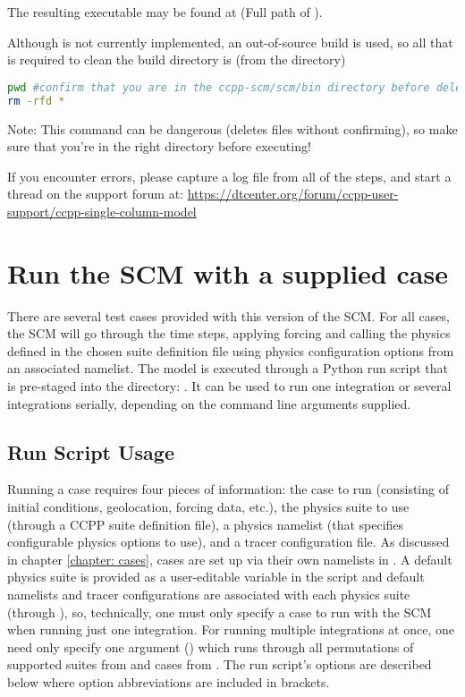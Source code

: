 The resulting executable may be found at  (Full path of ).

Although  is not currently implemented, an out-of-source build is used, so all that is required to clean the build directory is (from the  directory)
\begin{lstlisting}[language=bash]
pwd #confirm that you are in the ccpp-scm/scm/bin directory before deleting files
rm -rfd *
\end{lstlisting}
Note: This command can be dangerous (deletes files without confirming), so make sure that you're in the right directory before executing!

If you encounter errors, please capture a log file from all of the steps, and start a thread on the support forum at: \url{https://dtcenter.org/forum/ccpp-user-support/ccpp-single-column-model}

\section{Run the SCM with a supplied case}
There are several test cases provided with this version of the SCM. For all cases, the SCM will go through the time steps, applying forcing and calling the physics defined in the chosen suite definition file using physics configuration options from an associated namelist. The model is executed through a Python run script that is pre-staged into the  directory: . It can be used to run one integration or several integrations serially, depending on the command line arguments supplied.

\subsection{Run Script Usage} \label{subsection: singlerunscript}
Running a case requires four pieces of information: the case to run (consisting of initial conditions, geolocation, forcing data, etc.), the physics suite to use (through a CCPP suite definition file), a physics namelist (that specifies configurable physics options to use), and a tracer configuration file. As discussed in chapter \ref{chapter: cases}, cases are set up via their own namelists in . A default physics suite is provided as a user-editable variable in the script and default namelists and tracer configurations are associated with each physics suite (through ), so, technically, one must only specify a case to run with the SCM when running just one integration. For running multiple integrations at once, one need only specify one argument () which runs through all permutations of supported suites from  and cases from . The run script's options are described below where option abbreviations are included in brackets.

